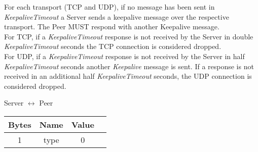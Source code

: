 For each transport (TCP and UDP), if no message has been sent in \emph{KeepaliveTimeout} a Server sends a keepalive
message over the respective transport. The Peer MUST respond with another Keepalive message.\\

For TCP, if a \emph{KeepaliveTimeout} response is not received by the Server in
double \emph{KeepaliveTimeout} seconds the TCP connection is considered dropped.\\

For UDP, if a \emph{KeepaliveTimeout} response is not received by the Server in
half  \emph{KeepaliveTimeout} seconds another \emph{Keepalive} message is sent. If a response is not received in
an additional half \emph{KeepaliveTimeout} seconds, the UDP connection is considered dropped.

\begin{center}
    Server $\leftrightarrow$ Peer\\
    \begin{tabular}{|c|c|c|c|}
        \hline
        \textbf{Bytes} & \textbf{Name} & \textbf{Value} \\
        \hline
        1              & type          & 0              \\
        \hline
    \end{tabular}
\end{center}